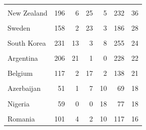 \documentclass[
]{article}
\begin{document}
\begin{table}[H]
\begin{tabular}[t]{lrrrrrr}
\cellcolor{gray!10}{Denmark} & \cellcolor{gray!10}{102} & \cellcolor{gray!10}{15} & \cellcolor{gray!10}{10} & \cellcolor{gray!10}{16} & \cellcolor{gray!10}{143} & \cellcolor{gray!10}{41}\\
\addlinespace
New Zealand & 196 & 6 & 25 & 5 & 232 & 36\\
\cellcolor{gray!10}{Jamaica} & \cellcolor{gray!10}{47} & \cellcolor{gray!10}{11} & \cellcolor{gray!10}{17} & \cellcolor{gray!10}{2} & \cellcolor{gray!10}{77} & \cellcolor{gray!10}{30}\\
Sweden & 158 & 2 & 23 & 3 & 186 & 28\\
\cellcolor{gray!10}{Croatia} & \cellcolor{gray!10}{69} & \cellcolor{gray!10}{7} & \cellcolor{gray!10}{15} & \cellcolor{gray!10}{2} & \cellcolor{gray!10}{93} & \cellcolor{gray!10}{24}\\
South Korea & 231 & 13 & 3 & 8 & 255 & 24\\
\addlinespace
\cellcolor{gray!10}{South Africa} & \cellcolor{gray!10}{132} & \cellcolor{gray!10}{2} & \cellcolor{gray!10}{7} & \cellcolor{gray!10}{14} & \cellcolor{gray!10}{155} & \cellcolor{gray!10}{23}\\
Argentina & 206 & 21 & 1 & 0 & 228 & 22\\
\cellcolor{gray!10}{Hungary} & \cellcolor{gray!10}{182} & \cellcolor{gray!10}{12} & \cellcolor{gray!10}{3} & \cellcolor{gray!10}{7} & \cellcolor{gray!10}{204} & \cellcolor{gray!10}{22}\\
Belgium & 117 & 2 & 17 & 2 & 138 & 21\\
\cellcolor{gray!10}{Norway} & \cellcolor{gray!10}{58} & \cellcolor{gray!10}{0} & \cellcolor{gray!10}{0} & \cellcolor{gray!10}{19} & \cellcolor{gray!10}{77} & \cellcolor{gray!10}{19}\\
\addlinespace
Azerbaijan & 51 & 1 & 7 & 10 & 69 & 18\\
\cellcolor{gray!10}{Kazakhstan} & \cellcolor{gray!10}{105} & \cellcolor{gray!10}{3} & \cellcolor{gray!10}{5} & \cellcolor{gray!10}{10} & \cellcolor{gray!10}{123} & \cellcolor{gray!10}{18}\\
Nigeria & 59 & 0 & 0 & 18 & 77 & 18\\
\cellcolor{gray!10}{Poland} & \cellcolor{gray!10}{269} & \cellcolor{gray!10}{3} & \cellcolor{gray!10}{3} & \cellcolor{gray!10}{10} & \cellcolor{gray!10}{285} & \cellcolor{gray!10}{16}\\
Romania & 101 & 4 & 2 & 10 & 117 & 16\\
\bottomrule
\end{tabular}
\end{table}
\end{document}
